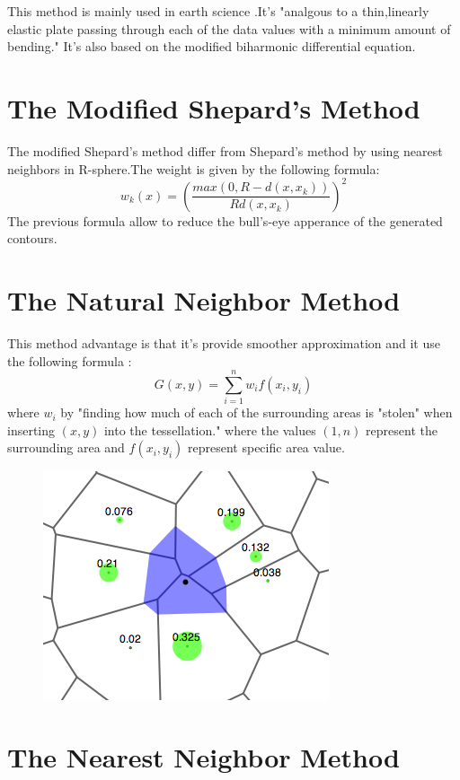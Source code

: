 \documentclass{article}
\begin{document}
\begin{multicols*}{2}
\begin{flushleft}
This method is mainly used in earth science \cite{1}.It's "analgous to a thin,linearly elastic plate passing through each of the data values with a minimum amount of bending." \cite{5} It's also based on the modified biharmonic differential equation.
\end{flushleft}
{\centering	\section{The Modified Shepard's Method}	}
\begin{flushleft}

The modified Shepard's method differ from Shepard's method by using nearest neighbors in R-sphere\cite{3}.The weight is given by the following formula: 
\[w_k(x)=\left(\frac{max(0,R-d(x,x_k))}{Rd(x,x_k)}\right)^2\]
The previous formula allow to reduce the bull's-eye apperance of the generated contours.\cite{1}\cite{3}
\end{flushleft}
{\centering	\section{The Natural Neighbor Method}}
This method advantage is that it's provide smoother approximation and it use the following formula : \[G(x,y)=\sum_{i=1}^{n}w_i f(x_i,y_i)\] where \(w_i\) by "finding how much of each of the surrounding areas is "stolen" when inserting \((x,y)\) into the tessellation."\cite{6} where the values \((1,n)\) represent the surrounding area and \(f(x_i,y_i)\) represent specific area value.
\begin{figure}[H]
	\begin{center}
		\includegraphics[scale=0.5]{Natural-neighbors-coefficients-example.png}
	\end{center}
\end{figure}
{\centering	\section{The Nearest Neighbor Method}}
\begin{flushleft}


\end{flushleft}
\end{multicols*}
\end{document}
